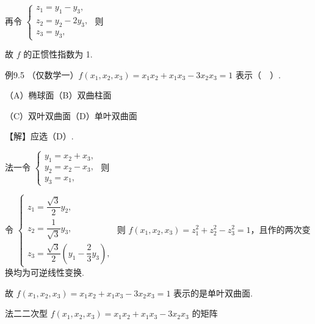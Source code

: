
再令 $\begin{cases}z_1=y_1-y_3,\\[2pt]z_2=y_2-2y_3,\\[2pt]z_3=y_3,\end{cases}$ 则


故 $f$ 的正惯性指数为 1.

\begin{fcard}{例9.5}
（仅数学一）$f(x_1,x_2,x_3)=x_1x_2+x_1x_3-3x_2x_3=1$ 表示（$\quad$）.

（A）椭球面\qquad（B）双曲柱面

（C）双叶双曲面\qquad（D）单叶双曲面

【解】应选（D）.

法一\quad 令 $\begin{cases}y_1=x_2+x_3,\\[2pt]y_2=x_2-x_3,\\[2pt]y_3=x_1,\end{cases}$ 则


令 $\begin{cases}z_1=\dfrac{\sqrt3}{2}y_2,\\[8pt]z_2=\dfrac{1}{\sqrt3}y_3,\\[8pt]z_3=\dfrac{\sqrt3}{2}\left(y_1-\dfrac23y_3\right),\end{cases}$ 则 $f(x_1,x_2,x_3)=z_1^2+z_2^2-z_3^2=1$，且作的两次变换均为可逆线性变换.

故 $f(x_1,x_2,x_3)=x_1x_2+x_1x_3-3x_2x_3=1$ 表示的是单叶双曲面.

法二\quad 二次型 $f(x_1,x_2,x_3)=x_1x_2+x_1x_3-3x_2x_3$ 的矩阵




\end{fcard}
